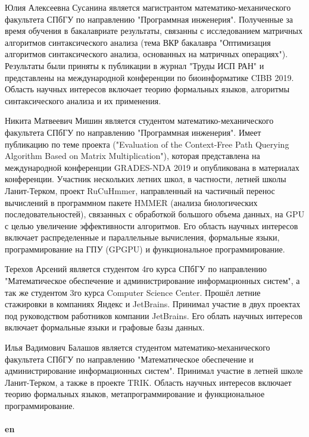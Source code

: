 \documentclass[12pt]{article}  %
\theoremstyle{remark}
\begin{document}
Юлия Алексеевна Сусанина является магистрантом математико-механического факультета СПбГУ по направлению "Программная инженерия". Полученные за время обучения в бакалавриате результаты, связанны с исследованием матричных алгоритмов синтаксического анализа (тема ВКР бакалавра "Оптимизация алгоритмов синтаксического анализа, основанных на матричных операциях"). Результаты были приняты к публикации в журнал "Труды ИСП РАН" и представлены на международной конференции по биоинформатике CIBB 2019. Область научных интересов включает теорию формальных языков, алгоритмы синтаксического анализа и их применения.

Никита Матвеевич Мишин является студентом математико-механического факультета СПбГУ  по направлению "Программная инженерия". Имеет публикацию по теме проекта ("Evaluation of the Context-Free Path Querying Algorithm Based on Matrix Multiplication"), которая представлена на международной конференции GRADES-NDA 2019 и опубликована в материалах конференции. Участник нескольких летних школ, в частности, летней школы Ланит-Терком, проект RuCuHmmer, направленный на частичный перенос вычислений в программном пакете HMMER (анализа биологических последовательностей), связанных с обработкой большого объема данных, на GPU с целью увеличение эффективности алгоритмов. Его область научных интересов включает распределенные и параллельные вычисления, формальные языки, программирование на ГПУ (GPGPU) и функциональное программирование.

Терехов Арсений является студентом 4го курса СПбГУ по направлению "Математическое обеспечение и администрирование информационных систем", а так же студентом 3го курса Computer Science Center. Прошёл летние стажировки в компаниях Яндекс и JetBrains. Принимал участие в двух проектах под руководством работников компании JetBrains. Его облать научных интересов включает формальные языки и графовые базы данных.

Илья Вадимович Балашов является студентом математико-механического факультета СПбГУ по направлению "Математическое обеспечение и администрирование информационных систем". Принимал участие в летней школе Ланит-Терком, а также в проекте TRIK. Область научных интересов включает теорию формальных языков, метапрограммирование и функциональное программирование.
\\
\\
\textbf{en}
\end{document}
